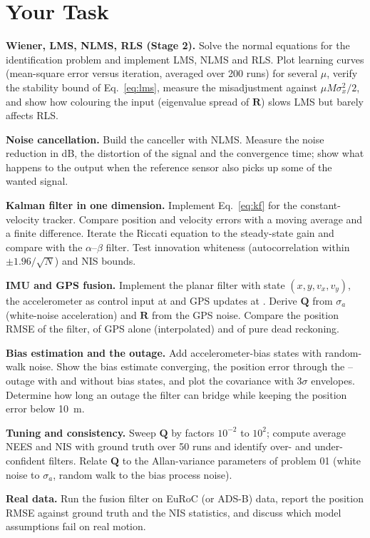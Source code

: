 \documentclass[11pt,a4paper]{article}
\begin{document}
\section*{Your Task}
\begin{tasks}
  \item \textbf{Wiener, LMS, NLMS, RLS (Stage 2).} Solve the normal equations for the identification problem and implement LMS, NLMS and RLS. Plot learning curves (mean-square error versus iteration, averaged over 200 runs) for several $\mu$, verify the stability bound of Eq.~\eqref{eq:lms}, measure the misadjustment against $\mu M\sigma_x^2/2$, and show how colouring the input (eigenvalue spread of $\mathbf R$) slows LMS but barely affects RLS.
  \item \textbf{Noise cancellation.} Build the canceller with NLMS. Measure the noise reduction in dB, the distortion of the  signal and the convergence time; show what happens to the output when the reference sensor also picks up some of the wanted signal.
  \item \textbf{Kalman filter in one dimension.} Implement Eq.~\eqref{eq:kf} for the constant-velocity tracker. Compare position and velocity errors with a moving average and a finite difference. Iterate the Riccati equation to the steady-state gain and compare with the $\alpha$--$\beta$ filter. Test innovation whiteness (autocorrelation within $\pm1.96/\sqrt N$) and NIS bounds.
  \item \textbf{IMU and GPS fusion.} Implement the planar filter with state $(x,y,v_x,v_y)$, the accelerometer as control input at  and GPS updates at . Derive $\mathbf Q$ from $\sigma_a$ (white-noise acceleration) and $\mathbf R$ from the GPS noise. Compare the position RMSE of the filter, of GPS alone (interpolated) and of pure dead reckoning.
  \item \textbf{Bias estimation and the outage.} Add accelerometer-bias states with random-walk noise. Show the bias estimate converging, the position error through the -- outage with and without bias states, and plot the covariance with $3\sigma$ envelopes. Determine how long an outage the filter can bridge while keeping the position error below \SI{10}{\metre}.
  \item \textbf{Tuning and consistency.} Sweep $\mathbf Q$ by factors $10^{-2}$ to $10^{2}$; compute average NEES and NIS with ground truth over 50 runs and identify over- and under-confident filters. Relate $\mathbf Q$ to the Allan-variance parameters of problem 01 (white noise to $\sigma_a$, random walk to the bias process noise).
  \item \textbf{Real data.} Run the fusion filter on EuRoC (or ADS-B) data, report the position RMSE against ground truth and the NIS statistics, and discuss which model assumptions fail on real motion.
\end{tasks}
\end{document}
